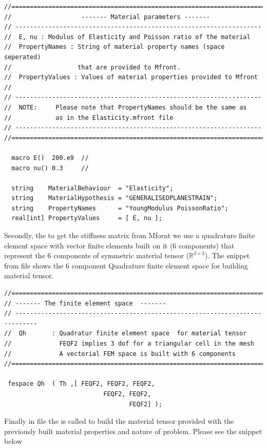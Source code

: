 \begin{lstlisting}[style=CppStyle]
//============================================================================
//                   ------- Material parameters -------
// -------------------------------------------------------------------
//  E, nu : Modulus of Elasticity and Poisson ratio of the material
//  PropertyNames : String of material property names (space seperated)
//                  that are provided to Mfront.
//  PropertyValues : Values of material properties provided to Mfront
//
// -------------------------------------------------------------------
//  NOTE:     Please note that PropertyNames should be the same as
//            as in the Elasticity.mfront file
// -------------------------------------------------------------------
//============================================================================

  macro E()  200.e9  //
  macro nu() 0.3     //

  string    MaterialBehaviour  = "Elasticity";
  string    MaterialHypothesis = "GENERALISEDPLANESTRAIN";
  string    PropertyNames      = "YoungModulus PoissonRatio";
  real[int] PropertyValues     = [ E, nu ];
\end{lstlisting}

Secondly, the to get the stiffness matrix from Mfornt we use a
quadrature finite element space with vector finite elements built on it
(6 components) that represent the 6 components of symmetric material
tensor (\(\mathbb R^{3 \times 3}\)). The snippet from
 file shows the 6 component Quadrature finite
element space for building material tensor.

\begin{lstlisting}[style=CppStyle]
//==============================================================================
// ------- The finite element space  -------
// ----------------------------------------------------------------------------
//  Qh       : Quadratur finite element space  for material tensor
//             FEQF2 implies 3 dof for a triangular cell in the mesh
//             A vectorial FEM space is built with 6 components
//==============================================================================

 fespace Qh  ( Th ,[ FEQF2, FEQF2, FEQF2,
                           FEQF2, FEQF2,
                                  FEQF2] );
\end{lstlisting}

Finally in file  the
 is called to build the material tensor
 provided with the previously built material properties and
nature of problem. Please see the snippet below

